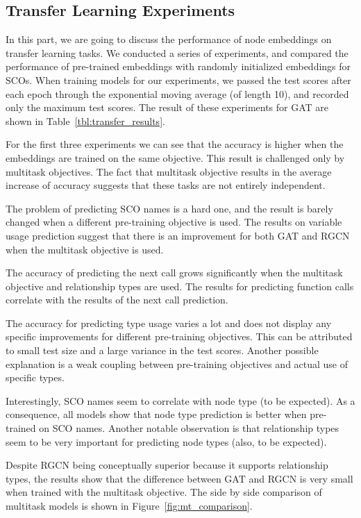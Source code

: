 \documentclass[a4paper,twoside]{article}
\begin{document}
\subsection{Transfer Learning Experiments}

In this part, we are going to discuss the performance of node embeddings on transfer learning tasks. We conducted a series of experiments, and compared the performance of pre-trained embeddings with randomly initialized embeddings for SCOs. When training models for our experiments, we passed the test scores after each epoch through the exponential moving average (of length 10), and recorded only the maximum test scores. The result of these experiments for GAT are shown in Table~\ref{tbl:transfer_results}.

For the first three experiments we can see that the accuracy is higher when the embeddings are trained on the same objective. This result is challenged only by multitask objectives. The fact that multitask objective results in the average increase of accuracy suggests that these tasks are not entirely independent.

The problem of predicting SCO names is a hard one, and the result is barely changed when a different pre-training objective is used. The results on variable usage prediction suggest that there is an improvement for both GAT and RGCN when the multitask objective is used. 

The accuracy of predicting the next call grows significantly when the multitask objective and relationship types are used. The results for predicting function calls correlate with the results of the next call prediction. 

The accuracy for predicting type usage varies a lot and does not display any specific improvements for different pre-training objectives. This can be attributed to small test size and a large variance in the test scores. Another possible explanation is a weak coupling between pre-training objectives and actual use of specific types. 

Interestingly, SCO names seem to correlate with node type (to be expected). As a consequence, all models show that node type prediction is better when pre-trained on SCO names. Another notable observation is that relationship types seem to be very important for predicting node types (also, to be expected).

Despite RGCN being conceptually superior because it supports relationship types, the results show that the difference between GAT and RGCN is very small when trained with the multitask objective. The side by side comparison of multitask models is shown in Figure~\ref{fig:mt_comparison}. 
\end{document}
